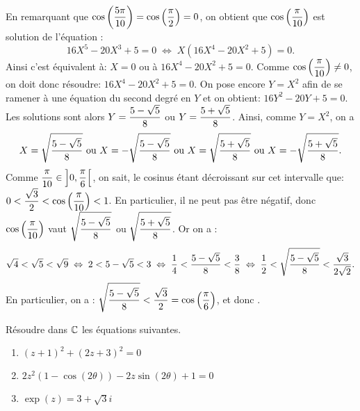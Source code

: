 \documentclass[a4paper, 11pt]{article}
\begin{document}
\begin{correction}
\begin{enumerate}
\begin{itemize}
En remarquant que $\displaystyle \cos{\left(\frac{5\pi}{10}\right)} = \cos{\left(\frac{\pi}{2}\right)}=0$, on obtient que $\displaystyle \cos{\left(\frac{\pi}{10}\right)}$ est solution de l'\'equation :
$$16X^5-20X^3+5 = 0 \; \Leftrightarrow \; X(16X^4-20X^2+5)=0.$$
Ainsi c'est \'equivalent \`{a}: $X=0$ ou \`{a} $16X^4-20X^2+5=0$. Comme $\cos{\left( \displaystyle\frac{\pi}{10}\right)}\not =0$, on doit donc r\'esoudre: $16X^4-20X^2+5=0$. On pose encore $Y=X^2$ afin de se ramener \`{a} une \'equation du second degr\'e en $Y$ et on obtient: $16Y^2-20Y+5=0$. Les solutions sont alors $Y=\displaystyle\frac{5-\sqrt{5}}{8}$ ou $Y=\displaystyle\frac{5+\sqrt{5}}{8}$. Ainsi, comme $Y=X^2$, on a
$$ X=\ddp\sqrt{\ddp\frac{5-\sqrt{5}}{8}}\ \hbox{ou}\ X=-\ddp\sqrt{\ddp\frac{5-\sqrt{5}}{8}}\ \hbox{ou}\ X=\ddp\sqrt{\ddp\frac{5+\sqrt{5}}{8}}\ \hbox{ou}\ X=-\ddp\sqrt{\ddp\frac{5+\sqrt{5}}{8}}.$$
Comme $\displaystyle\frac{\pi}{10}\in\left\rbrack 0,\displaystyle\frac{\pi}{6}\right\lbrack$, on sait, le cosinus \'etant d\'ecroissant sur cet intervalle que: $0<\displaystyle\frac{\sqrt{3}}{2}<\cos{\left( \displaystyle\frac{\pi}{10}\right)}<1$. En particulier, il ne peut pas \^{e}tre n\'egatif, donc $\displaystyle \cos\left(\frac{\pi}{10}\right)$ vaut $\displaystyle\sqrt{\displaystyle\frac{5-\sqrt{5}}{8}}$ ou $\displaystyle\sqrt{\displaystyle\frac{5+\sqrt{5}}{8}}$. Or on a :
$$\sqrt{4} < \sqrt{5} < \sqrt{9} \; \Leftrightarrow \; 2 < 5-\sqrt{5} < 3 \; \Leftrightarrow \; \frac{1}{4} <\frac{5-\sqrt{5}}{8} < \frac{3}{8} \; \Leftrightarrow \; \frac{1}{2} < \sqrt{\frac{5-\sqrt{5}}{8}} < \frac{\sqrt{3}}{2\sqrt{2}}.$$
En particulier, on a :  $\displaystyle\sqrt{\displaystyle\frac{5-\sqrt{5}}{8}}<\displaystyle\frac{\sqrt{3}}{2}=\cos\left(\frac{\pi}{6}\right)$, et donc 
 .
\end{itemize}
\end{enumerate}
\end{correction}





\begin{exercice}  \;
R\'esoudre dans $\mathbb{C}$ les \'equations suivantes.
\begin{enumerate}
\item $(z+1)^2+(2z+3)^2=0$
\item $2z^2(1-\cos{(2\theta)})-2z\sin{(2\theta)}+1=0$
\item $\exp(z)=3+\sqrt{3}i$
\end{enumerate}
\end{exercice}
\end{document}
